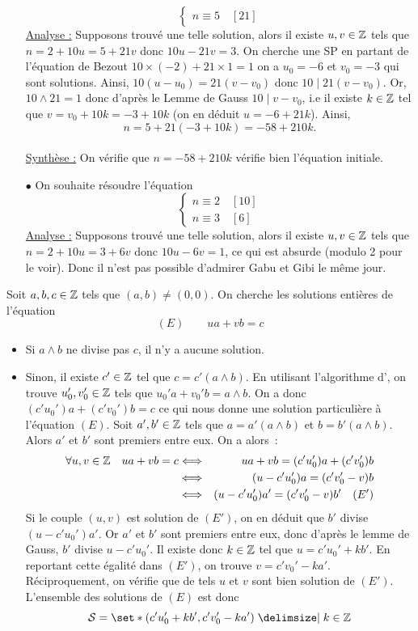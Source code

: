 \documentclass{magnolia}
\begin{document}
\begin{exos}
\begin{sol}
\begin{itemize}
$$\begin{cases}
  n\equiv 5\quad [21]\end{cases}$$
  \underline{Analyse :}
  Supposons trouvé une telle solution, alors il existe $u,v \in \mathbb{Z}$ tels que $n=2+10u=5+21v$ donc $10u-21v=3$. On cherche une SP en partant de l'équation de Bezout $10\times (-2)+21\times 1=1$ on a $u_0=-6$ et $v_0=-3$ qui sont solutions. Ainsi, $10(u-u_0)=21(v-v_0)$ donc $10 \mid 21(v-v_0)$. Or, $10\wedge 21=1$ donc d'après le Lemme de Gauss $10\mid v-v_0$, i.e il existe $k\in \mathbb{Z}$ tel que $v=v_0+10k=-3+10k$ (on en déduit $u=-6+21k$). Ainsi,
  $$n=5+21(-3+10k)=-58+210k.$$\\
  \underline{Synthèse :} On vérifie que $n=-58+210k$ vérifie bien l'équation initiale.
  \item[$\bullet$]On souhaite résoudre l'équation 
  $$\begin{cases}n\equiv 2\quad [10]\\
  n\equiv 3\quad [6]\end{cases}$$
  \underline{Analyse :}
  Supposons trouvé une telle solution, alors il existe $u,v \in \mathbb{Z}$ tels que $n=2+10u=3+6v$ donc $10u-6v=1$, ce qui est absurde (modulo 2 pour le voir). Donc il n'est pas possible d'admirer Gabu et Gibi le même jour. 
  \end{itemize}
  \end{sol}
\end{exos}

\begin{remarqueUnique}
\remarque Soit $a,b,c\in\mathbb{Z}$ tels que $(a,b)\neq (0,0)$. On cherche les
  solutions entières de l'équation
  \[(E) \qquad ua+vb=c\]
  \begin{itemize}
  \item Si $a\wedge b$ ne divise pas $c$, il n'y a aucune solution.
  \item Sinon, il existe $c'\in\mathbb{Z}$ tel que $c=c'(a\wedge b)$.
    En utilisant l'algorithme d', on trouve $u_0',v_0'\in\mathbb{Z}$ tels que
    $u_0' a+v_0' b=a\wedge b$. On a donc $(c'u_0')a+(c'v_0')b=c$ ce qui nous
    donne une solution particulière à l'équation $(E)$. Soit $a',b'\in\mathbb{Z}$ tels
    que $a=a'(a\wedge b)$ et $b=b'(a\wedge b)$. Alors $a'$ et $b'$ sont premiers
    entre eux. On a alors~:
    \begin{eqnarray*}
    \forall u,v\in\mathbb{Z} \quad ua+vb=c
    &\Longleftrightarrow& ua+vb=(c'u_0')a+(c'v_0')b\\
    &\Longleftrightarrow& (u-c'u_0')a=(c'v_0'-v)b\\
    &\Longleftrightarrow& (u-c'u_0')a'=(c'v_0'-v)b' \quad (E')
    \end{eqnarray*}
    Si le couple $(u,v)$ est solution de $(E')$, on en déduit que $b'$ divise
    $(u-c'u_0')a'$. Or $a'$ et $b'$ sont premiers entre eux, donc d'après le
    lemme de Gauss, $b'$ divise $u-c'u_0'$. Il existe donc $k\in\mathbb{Z}$ tel que
    $u=c'u_0'+kb'$. En reportant cette égalité dans $(E')$, on trouve
    $v=c'v_0'-ka'$. Réciproquement, on vérifie que de tels $u$ et $v$ sont
    bien solution de $(E')$. L'ensemble des solutions de $(E)$ est donc
    \[\mathcal{S}=\enstq{(c'u_0'+kb',c'v_0'-ka')}{k\in\Z}\]
  \end{itemize}
\end{remarqueUnique}
\end{document}
